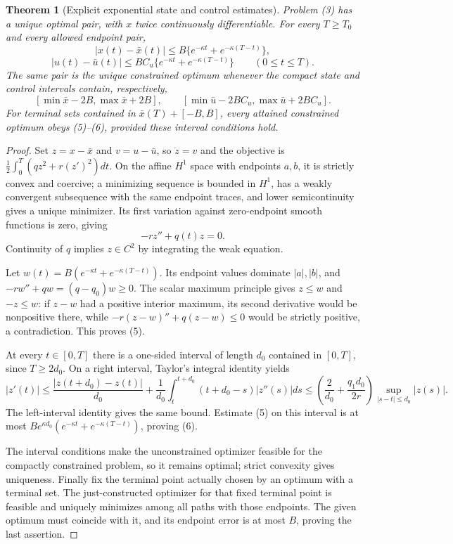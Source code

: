 \documentclass[11pt,a4paper]{article}
\newtheorem{theorem}{Theorem}[section]
\theoremstyle{definition}
\theoremstyle{remark}
\begin{document}
\begin{theorem}[Explicit exponential state and control estimates]
Problem (3) has a unique optimal pair, with $x$ twice continuously differentiable. For every $T\ge T_0$ and every allowed endpoint pair,
\[
 |x(t)-\bar x(t)|\le B\{e^{-\kappa t}+e^{-\kappa(T-t)}\},
 \tag{5}
\]
\[
 |u(t)-\bar u(t)|\le BC_u\{e^{-\kappa t}+e^{-\kappa(T-t)}\}
 \qquad (0\le t\le T).
 \tag{6}
\]
The same pair is the unique constrained optimum whenever the compact state and control intervals contain, respectively,
\[
 [\min\bar x-2B,\max\bar x+2B],\qquad
 [\min\bar u-2BC_u,\max\bar u+2BC_u].
\]
For terminal sets contained in $\bar x(T)+[-B,B]$, every attained constrained optimum obeys (5)--(6), provided these interval conditions hold.
\end{theorem}
\begin{proof}
Set $z=x-\bar x$ and $v=u-\bar u$, so $\dot z=v$ and the objective is
$\tfrac12\int_0^T(qz^2+r(z')^2)dt$. On the affine $H^1$ space with endpoints $a,b$, it is strictly convex and coercive; a minimizing sequence is bounded in $H^1$, has a weakly convergent subsequence with the same endpoint traces, and lower semicontinuity gives a unique minimizer. Its first variation against zero-endpoint smooth functions is zero, giving
\[
 -rz''+q(t)z=0. \tag{7}
\]
Continuity of $q$ implies $z\in C^2$ by integrating the weak equation.

Let $w(t)=B(e^{-\kappa t}+e^{-\kappa(T-t)})$. Its endpoint values dominate $|a|,|b|$, and
$-rw''+qw=(q-q_0)w\ge0$. The scalar maximum principle gives $z\le w$ and $-z\le w$: if $z-w$ had a positive interior maximum, its second derivative would be nonpositive there, while
$-r(z-w)''+q(z-w)\le0$ would be strictly positive, a contradiction. This proves (5).

At every $t\in[0,T]$ there is a one-sided interval of length $d_0$ contained in $[0,T]$, since $T\ge2d_0$. On a right interval, Taylor's integral identity yields
\[
 |z'(t)|\le\frac{|z(t+d_0)-z(t)|}{d_0}
       +\frac1{d_0}\int_t^{t+d_0}(t+d_0-s)|z''(s)|ds
 \le\left(\frac2{d_0}+\frac{q_1d_0}{2r}\right)
                         \sup_{|s-t|\le d_0}|z(s)|.
\]
The left-interval identity gives the same bound. Estimate (5) on this interval is at most
$Be^{\kappa d_0}(e^{-\kappa t}+e^{-\kappa(T-t)})$, proving (6).

The interval conditions make the unconstrained optimizer feasible for the compactly constrained problem, so it remains optimal; strict convexity gives uniqueness. Finally fix the terminal point actually chosen by an optimum with a terminal set. The just-constructed optimizer for that fixed terminal point is feasible and uniquely minimizes among all paths with those endpoints. The given optimum must coincide with it, and its endpoint error is at most $B$, proving the last assertion.
\end{proof}
\end{document}
